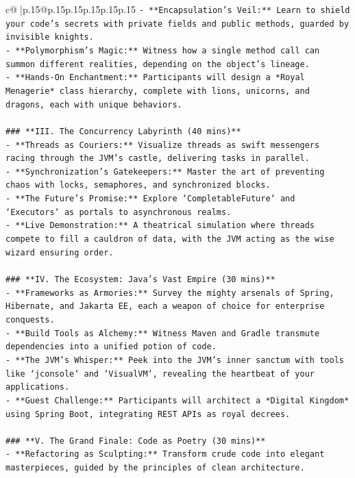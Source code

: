 \documentclass{article}
\begin{document}
{\begin{supertabular}{c@{$\;$}|p{.15\linewidth}@{}p{.15\linewidth}p{.15\linewidth}p{.15\linewidth}p{.15\linewidth}p{.15\linewidth}}
{{{\texttt{{-} **Encapsulation’s Veil:** Learn to shield your code’s secrets with private fields and public methods, guarded by invisible knights.  } \\
\texttt{{-} **Polymorphism’s Magic:** Witness how a single method call can summon different realities, depending on the object’s lineage.  } \\
\texttt{{-} **Hands{-}On Enchantment:** Participants will design a *Royal Menagerie* class hierarchy, complete with lions, unicorns, and dragons, each with unique behaviors.  } \\
\\ 
\texttt{\#\#\# **III. The Concurrency Labyrinth (40 mins)**  } \\
\texttt{{-} **Threads as Couriers:** Visualize threads as swift messengers racing through the JVM’s castle, delivering tasks in parallel.  } \\
\texttt{{-} **Synchronization’s Gatekeepers:** Master the art of preventing chaos with locks, semaphores, and synchronized blocks.  } \\
\texttt{{-} **The Future’s Promise:** Explore `CompletableFuture` and `Executors` as portals to asynchronous realms.  } \\
\texttt{{-} **Live Demonstration:** A theatrical simulation where threads compete to fill a cauldron of data, with the JVM acting as the wise wizard ensuring order.  } \\
\\ 
\texttt{\#\#\# **IV. The Ecosystem: Java’s Vast Empire (30 mins)**  } \\
\texttt{{-} **Frameworks as Armories:** Survey the mighty arsenals of Spring, Hibernate, and Jakarta EE, each a weapon of choice for enterprise conquests.  } \\
\texttt{{-} **Build Tools as Alchemy:** Witness Maven and Gradle transmute dependencies into a unified potion of code.  } \\
\texttt{{-} **The JVM’s Whisper:** Peek into the JVM’s inner sanctum with tools like `jconsole` and `VisualVM`, revealing the heartbeat of your applications.  } \\
\texttt{{-} **Guest Challenge:** Participants will architect a *Digital Kingdom* using Spring Boot, integrating REST APIs as royal decrees.  } \\
\\ 
\texttt{\#\#\# **V. The Grand Finale: Code as Poetry (30 mins)**  } \\
\texttt{{-} **Refactoring as Sculpting:** Transform crude code into elegant masterpieces, guided by the principles of clean architecture.  } \\
}}}
\end{supertabular}}
\end{document}
